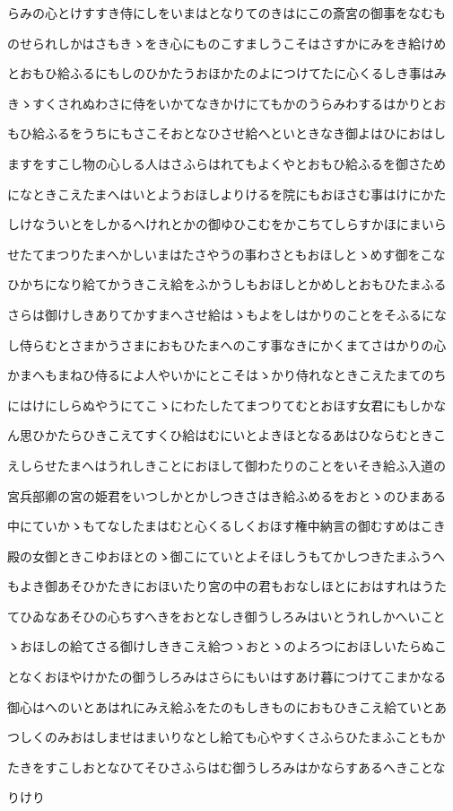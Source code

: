 \documentclass[a4paper,11pt,landscape]{ltjtarticle}
\begin{document}
\par\medskip
らみの心とけすすき侍にしをいまはとなりてのきはにこの斎宮の御事をなむも
\par\medskip
のせられしかはさもきゝをき心にものこすましうこそはさすかにみをき給けめ
\par\medskip
とおもひ給ふるにもしのひかたうおほかたのよにつけてたに心くるしき事はみ
\par\medskip
きゝすくされぬわさに侍をいかてなきかけにてもかのうらみわするはかりとお
\par\medskip
もひ給ふるをうちにもさこそおとなひさせ給へといときなき御よはひにおはし
\par\medskip
ますをすこし物の心しる人はさふらはれてもよくやとおもひ給ふるを御さため
\par\medskip
になときこえたまへはいとようおほしよりけるを院にもおほさむ事はけにかた
\par\medskip
しけなういとをしかるへけれとかの御ゆひこむをかこちてしらすかほにまいら
\par\medskip
せたてまつりたまへかしいまはたさやうの事わさともおほしとゝめす御をこな
\par\medskip
ひかちになり給てかうきこえ給をふかうしもおほしとかめしとおもひたまふる
\par\medskip
さらは御けしきありてかすまへさせ給はゝもよをしはかりのことをそふるにな
\par\medskip
し侍らむとさまかうさまにおもひたまへのこす事なきにかくまてさはかりの心
\par\medskip
かまへもまねひ侍るによ人やいかにとこそはゝかり侍れなときこえたまてのち
\par\medskip
にはけにしらぬやうにてこゝにわたしたてまつりてむとおほす女君にもしかな
\par\medskip
ん思ひかたらひきこえてすくひ給はむにいとよきほとなるあはひならむときこ
\par\medskip
えしらせたまへはうれしきことにおほして御わたりのことをいそき給ふ入道の
\par\medskip
宮兵部卿の宮の姫君をいつしかとかしつきさはき給ふめるをおとゝのひまある
\par\medskip
中にていかゝもてなしたまはむと心くるしくおほす権中納言の御むすめはこき
\par\medskip
殿の女御ときこゆおほとのゝ御こにていとよそほしうもてかしつきたまふうへ
\par\medskip
もよき御あそひかたきにおほいたり宮の中の君もおなしほとにおはすれはうた
\par\medskip
てひゐなあそひの心ちすへきをおとなしき御うしろみはいとうれしかへいこと
\par\medskip
ゝおほしの給てさる御けしききこえ給つゝおとゝのよろつにおほしいたらぬこ
\par\medskip
となくおほやけかたの御うしろみはさらにもいはすあけ暮につけてこまかなる
\par\medskip
御心はへのいとあはれにみえ給ふをたのもしきものにおもひきこえ給ていとあ
\par\medskip
つしくのみおはしませはまいりなとし給ても心やすくさふらひたまふこともか
\par\medskip
たきをすこしおとなひてそひさふらはむ御うしろみはかならすあるへきことな
\par\medskip
りけり
\par\medskip
\end{document}
